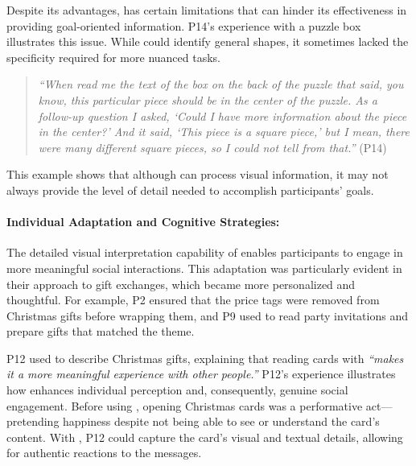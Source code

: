 Despite its advantages, \bma{} has certain limitations that can hinder its effectiveness in providing goal-oriented information. P14's experience with a puzzle box illustrates this issue. While \bma{} could identify general shapes, it sometimes lacked the specificity required for more nuanced tasks.
% 



\begin{quote}
    \textit{``When \bma{} read me the text of the box on the back of the puzzle that said, you know, this particular piece should be in the center of the puzzle. As a follow-up question I asked, `Could I have more information about the piece in the center?' And it said, `This piece is a square piece,' but I mean, there were many different square pieces, so I could not tell from that.''} (P14)
\end{quote}
This example shows that although \bma{} can process visual information, it may not always provide the level of detail needed to accomplish participants' goals. 





\paragraph{Individual Adaptation and Cognitive Strategies:}

The detailed visual interpretation capability of \bma{} enables participants to engage in more meaningful social interactions.
This adaptation was particularly evident in their approach to gift exchanges, which became more personalized and thoughtful. For example, P2 ensured that the price tags were removed from Christmas gifts before wrapping them, and P9 used \bma{} to read party invitations and prepare gifts that matched the theme. 



P12 used \bma{} to describe Christmas gifts, explaining that reading cards with \bma{} \textit{``makes it a more meaningful experience with other people.''}
% 
P12's experience illustrates how \bma{} enhances individual perception and, consequently, genuine social engagement. Before using \bma, opening Christmas cards was a performative act—pretending happiness despite not being able to see or understand the card's content. 
With \bma, P12 could capture the card's visual and textual details, allowing for authentic reactions to the messages. 

